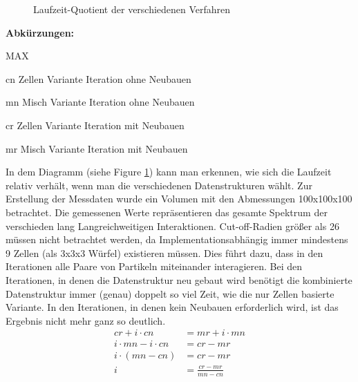 \documentclass[
	12pt,
	a4paper,
	BCOR10mm,
	DIV14,
	headsepline,
]{scrreprt}
\begin{document}
	\begin{figure}[h]
		\centering
		\caption{Laufzeit-Quotient der verschiedenen Verfahren}
		\label{figure:LaufzeitQuotient}
	\end{figure}
	\footnotesize\textbf{Abkürzungen:}\begin{labeling}[~--]{MAX}
		\item[cn] Zellen Variante Iteration ohne Neubauen
		\item[mn] Misch Variante Iteration ohne Neubauen
		\item[cr] Zellen Variante Iteration mit Neubauen
		\item[mr] Misch Variante Iteration mit Neubauen
	\end{labeling}
	In dem Diagramm (siehe Figure \ref{figure:LaufzeitQuotient}) kann man erkennen, wie sich die Laufzeit relativ verhält, wenn man die verschiedenen Datenstrukturen wählt. Zur Erstellung der Messdaten wurde ein Volumen mit den Abmessungen 100x100x100  betrachtet. Die gemessenen Werte repräsentieren das gesamte Spektrum der verschieden lang Langreichweitigen Interaktionen. Cut-off-Radien größer als 26 müssen nicht betrachtet werden, da Implementationsabhängig immer mindestens 9 Zellen (als 3x3x3 Würfel) existieren müssen. Dies führt dazu, dass in den Iterationen alle Paare von Partikeln miteinander interagieren. Bei den Iterationen, in denen die Datenstruktur neu gebaut wird benötigt die kombinierte Datenstruktur immer (genau) doppelt so viel Zeit, wie die nur Zellen basierte Variante. In den Iterationen, in denen kein Neubauen erforderlich wird, ist das Ergebnis nicht mehr ganz so deutlich.
    \begin{align*}
    	cr+i\cdot cn&=mr+i\cdot mn\\
        i\cdot mn-i\cdot cn&=cr-mr\\
        i\cdot (mn-cn)&=cr-mr\\
    	i&=\frac{cr-mr}{mn-cn}
    \end{align*}
\end{document}
